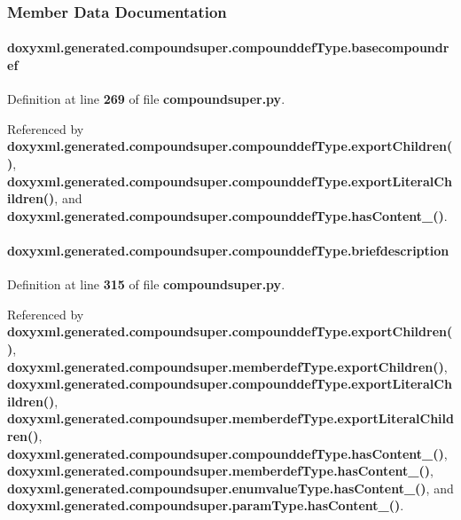 \subsubsection{Member Data Documentation}
\paragraph[{basecompoundref}]{\setlength{\rightskip}{0pt plus 5cm}doxyxml.\+generated.\+compoundsuper.\+compounddef\+Type.\+basecompoundref}\label{classdoxyxml_1_1generated_1_1compoundsuper_1_1compounddefType_ad5a2118d03c2efd61c4509bf1267d7a6}


Definition at line {\bf 269} of file {\bf compoundsuper.\+py}.



Referenced by {\bf doxyxml.\+generated.\+compoundsuper.\+compounddef\+Type.\+export\+Children()}, {\bf doxyxml.\+generated.\+compoundsuper.\+compounddef\+Type.\+export\+Literal\+Children()}, and {\bf doxyxml.\+generated.\+compoundsuper.\+compounddef\+Type.\+has\+Content\+\_\+()}.

\paragraph[{briefdescription}]{\setlength{\rightskip}{0pt plus 5cm}doxyxml.\+generated.\+compoundsuper.\+compounddef\+Type.\+briefdescription}\label{classdoxyxml_1_1generated_1_1compoundsuper_1_1compounddefType_a08fd5a2c46c9e034abe03b305492ce14}


Definition at line {\bf 315} of file {\bf compoundsuper.\+py}.



Referenced by {\bf doxyxml.\+generated.\+compoundsuper.\+compounddef\+Type.\+export\+Children()}, {\bf doxyxml.\+generated.\+compoundsuper.\+memberdef\+Type.\+export\+Children()}, {\bf doxyxml.\+generated.\+compoundsuper.\+compounddef\+Type.\+export\+Literal\+Children()}, {\bf doxyxml.\+generated.\+compoundsuper.\+memberdef\+Type.\+export\+Literal\+Children()}, {\bf doxyxml.\+generated.\+compoundsuper.\+compounddef\+Type.\+has\+Content\+\_\+()}, {\bf doxyxml.\+generated.\+compoundsuper.\+memberdef\+Type.\+has\+Content\+\_\+()}, {\bf doxyxml.\+generated.\+compoundsuper.\+enumvalue\+Type.\+has\+Content\+\_\+()}, and {\bf doxyxml.\+generated.\+compoundsuper.\+param\+Type.\+has\+Content\+\_\+()}.

